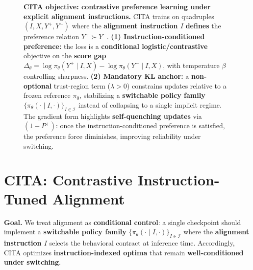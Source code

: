 \begin{figure}[ht!]
\vspace{-0.9em}
\caption{
\textbf{CITA objective: contrastive preference learning under explicit alignment instructions.}
CITA trains on quadruples $(I,X,Y^+,Y^-)$ where the \textbf{alignment instruction $I$} \textbf{defines} the preference relation $Y^+\succ Y^-$.
\textbf{(1) Instruction-conditioned preference:} the loss is a \textbf{conditional logistic/contrastive} objective on the \textbf{score gap}
$\Delta_\theta=\log \pi_\theta(Y^+\!\mid I,X)-\log \pi_\theta(Y^-\!\mid I,X)$, with temperature $\beta$ controlling sharpness.
\textbf{(2) Mandatory KL anchor:} a \textbf{non-optional} trust-region term ($\lambda>0$) constrains updates relative to a frozen reference $\pi_0$,
stabilizing a \textbf{switchable policy family} $\{\pi_\theta(\cdot\mid I,\cdot)\}_{I\in\mathcal{I}}$ instead of collapsing to a single implicit regime.
The gradient form highlights \textbf{self-quenching updates} via $(1-P^+)$: once the instruction-conditioned preference is satisfied, the preference force diminishes, improving reliability under switching.
}
\label{fig:cita_objective_box}
\vspace{-1.2em}
\end{figure}



\section{CITA: Contrastive Instruction-Tuned Alignment}
\label{sec:cita_framework}

\textbf{Goal.} We treat alignment as \textbf{conditional control}: a single checkpoint should implement a \textbf{switchable policy family}
$\{\pi_\theta(\cdot\mid I,\cdot)\}_{I\in\mathcal{I}}$ where the \textbf{alignment instruction $I$} selects the behavioral contract at inference time.
Accordingly, CITA optimizes \textbf{instruction-indexed optima} that remain \textbf{well-conditioned under switching}.

